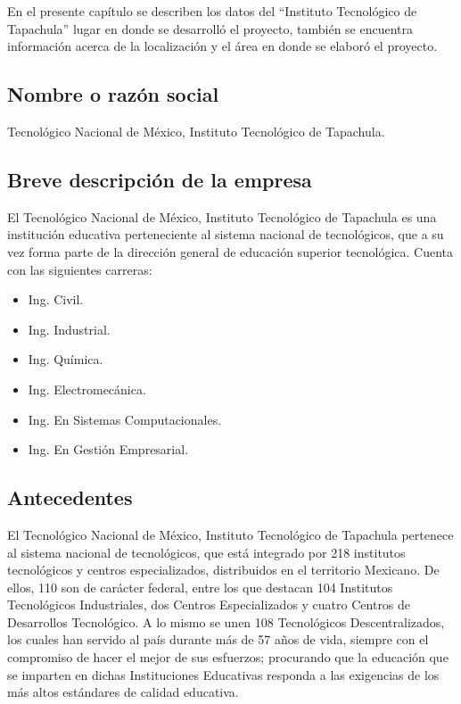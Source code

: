 En el presente capítulo se describen los datos del “Instituto Tecnológico de Tapachula” lugar en donde se desarrolló el proyecto, también se encuentra información acerca de la localización y el área en donde se elaboró el proyecto.

\subsection*{Nombre o razón social}
Tecnológico Nacional de México, Instituto Tecnológico de Tapachula.

\subsection*{Breve descripción de la empresa}
El Tecnológico Nacional de México, Instituto Tecnológico de Tapachula es una institución educativa perteneciente al sistema nacional de tecnológicos, que a su vez forma parte de la dirección general de educación superior tecnológica. Cuenta con las siguientes carreras: 
\begin{multicols}{2}
{\setlength{\baselineskip}{0.7\baselineskip}\begin{itemize}
	\item Ing. Civil.
	\item Ing. Industrial.
	\item Ing. Química.
	\item Ing. Electromecánica.
	\item Ing. En Sistemas Computacionales.
	\item Ing. En Gestión Empresarial.
\end{itemize}}
\end{multicols}

\subsection*{Antecedentes}


El Tecnológico Nacional de México, Instituto Tecnológico de Tapachula pertenece al sistema nacional de tecnológicos, que está integrado por 218 institutos tecnológicos y centros especializados, distribuidos en el territorio Mexicano. De ellos, 110 son de carácter federal, entre los que destacan 104 Institutos Tecnológicos Industriales, dos Centros Especializados y cuatro Centros de Desarrollos Tecnológico. A lo mismo se unen 108 Tecnológicos Descentralizados, los cuales han servido al país durante más de 57 años de vida, siempre con el compromiso de hacer el mejor de sus esfuerzos; procurando que la educación que se imparten en dichas Instituciones Educativas responda a las exigencias de los más altos estándares de calidad educativa.

